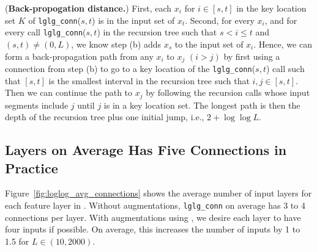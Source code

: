 \begin{myproof}
(\textbf{Back-propogation distance.})
First, each $x_i$ for $i \in [s,t]$ in the key location set $K$ of \verb=lglg_conn=($s,t$) is in the input set of $x_t$. 
Second, for every $x_i$, and for every call \verb=lglg_conn=($s,t$) in the recursion tree such that $s < i \leq t$ and $(s,t) \neq (0,L)$, we know step (b) adds $x_s$ to the input set of $x_i$. Hence, we can form a back-propagation path from any $x_i$ to $x_j$ $(i  > j)$ by first using a connection from step (b) to go to a key location of the \verb=lglg_conn=($s,t$) call such that $[s,t]$ is the smallest interval in the recursion tree such that $i,j \in [s,t]$. Then we can continue the path to $x_j$ by following the recursion calls whose input segments include $j$ until $j$ is in a key location set. The longest path is then the depth of the recursion tree plus one initial jump, i.e., $2 + \log\log L$.



\end{myproof}



\subsection{\loglogdense Layers on Average Has Five Connections in Practice}
Figure~\ref{fig:loglog_avg_connections} shows the average number of input layers for each feature layer in \loglogdense. Without augmentations, \verb=lglg_conn= on average has 3 to 4 connections per layer. With augmentations using \logdense, we desire each layer to have four inputs if possible. On average, this increases the number of inputs by 1 to 1.5 for $L \in (10, 2000)$.


